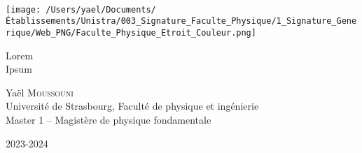 \documentclass[11pt, a4paper]{article} %
\title{\titre\\\soustitre}
\author{\auteur\\\etab}
\date{\ladate}
\def\titre{Lorem}
\def\soustitre{Ipsum}
\def\auteur{Yaël \textsc{Moussouni}}
\def\etab{Université de Strasbourg, Faculté de physique et ingénierie\\ Master 1 -- Magistère de physique fondamentale}
\def\ladate{2023-2024}
\begin{document}
\thispagestyle{empty}
\texttt{[image: /Users/yael/Documents/Établissements/Unistra/003\_Signature\_Faculte\_Physique/1\_Signature\_Generique/Web\_PNG/Faculte\_Physique\_Etroit\_Couleur.png]}
\vspace*{3cm}
\begin{spacing}{1.7}
   \begin{center}
   {\huge\noindent\titre\\\soustitre}
   
   \vspace*{1cm}
   {\large\auteur\\\etab}
   
   \vspace*{1cm}
   {\large\ladate}
   \end{center}
\end{spacing}

   
   
   

\vfill
\begin{center}
\end{center}
\vfill

\newpage
\tableofcontents
\newpage
\end{document}
